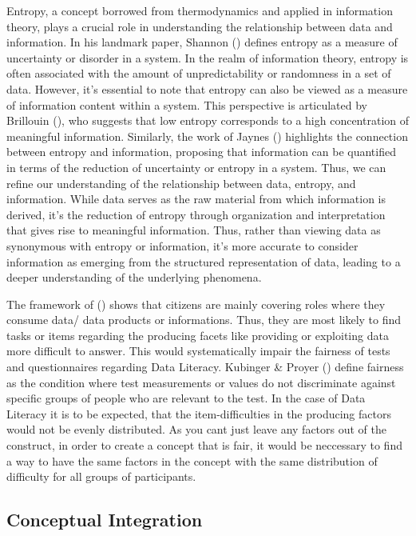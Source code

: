 \documentclass[
  12pt,
  a4paper,
  twoside]{article}
\begin{document}
Entropy, a concept borrowed from thermodynamics and applied in information theory, plays a crucial role in understanding the relationship between data and information. In his landmark paper, Shannon () defines entropy as a measure of uncertainty or disorder in a system. In the realm of information theory, entropy is often associated with the amount of unpredictability or randomness in a set of data. However, it's essential to note that entropy can also be viewed as a measure of information content within a system. This perspective is articulated by Brillouin (), who suggests that low entropy corresponds to a high concentration of meaningful information. Similarly, the work of Jaynes () highlights the connection between entropy and information, proposing that information can be quantified in terms of the reduction of uncertainty or entropy in a system.
Thus, we can refine our understanding of the relationship between data, entropy, and information. While data serves as the raw material from which information is derived, it's the reduction of entropy through organization and interpretation that gives rise to meaningful information. Thus, rather than viewing data as synonymous with entropy or information, it's more accurate to consider information as emerging from the structured representation of data, leading to a deeper understanding of the underlying phenomena.

The framework of () shows that citizens are mainly covering roles where they consume data/ data products or informations.
Thus, they are most likely to find tasks or items regarding the producing facets like providing or exploiting data more difficult to answer. This would systematically impair the fairness of tests and questionnaires regarding Data Literacy. Kubinger \& Proyer () define fairness as the condition where test measurements or values do not discriminate against specific groups of people who are relevant to the test. In the case of Data Literacy it is to be expected, that the item-difficulties in the producing factors would not be evenly distributed. As you cant just leave any factors out of the construct, in order to create a concept that is fair, it would be neccessary to find a way to have the same factors in the concept with the same distribution of difficulty for all groups of participants.

\subsection{Conceptual Integration}\label{conceptual-integration}
\end{document}

